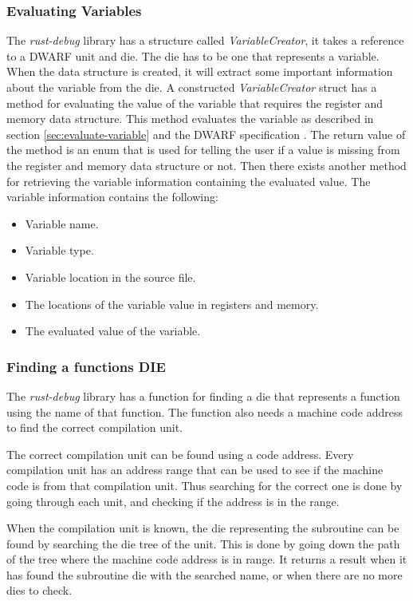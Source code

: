 \subsubsection{Evaluating Variables} \label{sec:ievalvar}
The \emph{rust-debug} library has a structure called \emph{VariableCreator}, it takes a reference to a \gls{DWARF} unit and \gls{die}.
The \gls{die} has to be one that represents a variable.
When the data structure is created, it will extract some important information about the variable from the \gls{die}. A constructed \emph{VariableCreator} struct has a method for evaluating the value of the variable that requires the register and memory data structure.
This method evaluates the variable as described in section \ref{sec:evaluate-variable} and the \gls{DWARF} specification \cite{dwarf}.
The return value of the method is an enum that is used for telling the user if a value is missing from the register and memory data structure or not.
Then there exists another method for retrieving the variable information containing the evaluated value.
The variable information contains the following:

\begin{itemize}
  \item Variable name.
  \item Variable type.
  \item Variable location in the source file.
  \item The locations of the variable value in registers and memory.
  \item The evaluated value of the variable.
\end{itemize}


\subsubsection{Finding a functions DIE} \label{sec:funcdie}
The \emph{rust-debug} library has a function for finding a \gls{die} that represents a function using the name of that function.
The function also needs a machine code address to find the correct compilation unit.


The correct compilation unit can be found using a code address.
Every compilation unit has an address range that can be used to see if the machine code is from that compilation unit.
Thus searching for the correct one is done by going through each unit, and checking if the address is in the range.


When the compilation unit is known, the \gls{die} representing the subroutine can be found by searching the \gls{die} tree of the unit.
This is done by going down the path of the tree where the machine code address is in range.
It returns a result when it has found the subroutine \gls{die} with the searched name, or when there are no more \glspl{die} to check.


